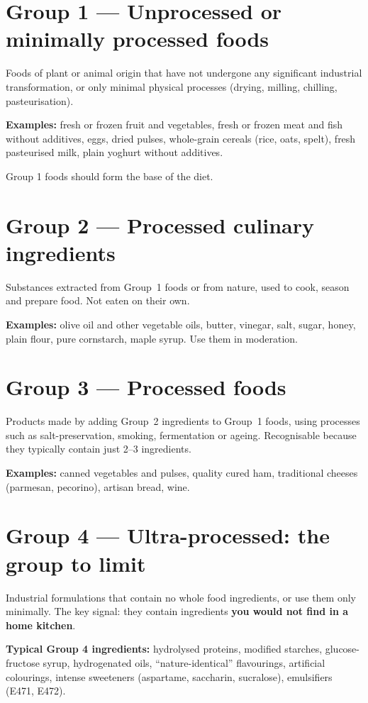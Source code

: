 \documentclass[a5paper,12pt,oneside,openany]{book}
\begin{document}
\section{Group 1 --- Unprocessed or minimally processed foods}

Foods of plant or animal origin that have not undergone any significant
industrial transformation, or only minimal physical processes (drying,
milling, chilling, pasteurisation).

\textbf{Examples:} fresh or frozen fruit and vegetables, fresh or frozen
meat and fish without additives, eggs, dried pulses, whole-grain cereals
(rice, oats, spelt), fresh pasteurised milk, plain yoghurt without
additives.

Group 1 foods should form the base of the diet.

\section{Group 2 --- Processed culinary ingredients}

Substances extracted from Group~1 foods or from nature, used to cook,
season and prepare food. Not eaten on their own.

\textbf{Examples:} olive oil and other vegetable oils, butter, vinegar,
salt, sugar, honey, plain flour, pure cornstarch, maple syrup. Use them
in moderation.

\section{Group 3 --- Processed foods}

Products made by adding Group~2 ingredients to Group~1 foods, using
processes such as salt-preservation, smoking, fermentation or ageing.
Recognisable because they typically contain just 2--3 ingredients.

\textbf{Examples:} canned vegetables and pulses, quality cured ham,
traditional cheeses (parmesan, pecorino), artisan bread, wine.

\section{Group 4 --- Ultra-processed: the group to limit}

Industrial formulations that contain no whole food ingredients, or use
them only minimally. The key signal: they contain ingredients
\textbf{you would not find in a home kitchen}.

\textbf{Typical Group 4 ingredients:} hydrolysed proteins, modified
starches, glucose-fructose syrup, hydrogenated oils, ``nature-identical''
flavourings, artificial colourings, intense sweeteners (aspartame,
saccharin, sucralose), emulsifiers (E471, E472).
\end{document}
